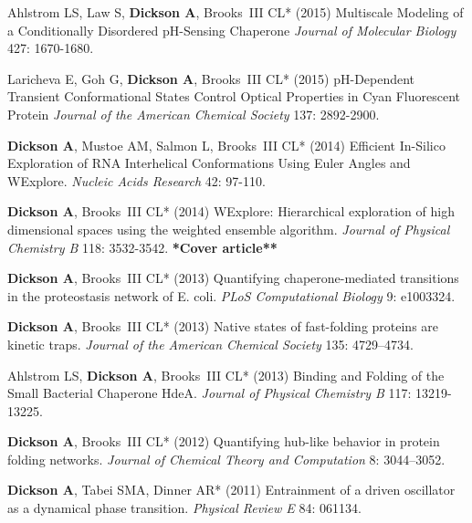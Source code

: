 \documentclass[margin,line]{res}
\begin{document}
\begin{resume}
\begin{spacing}{1.2}
\begin{thebibliography}{10}
Ahlstrom LS, Law S, {\bf Dickson A}, Brooks~{III} CL* (2015)
Multiscale Modeling of a Conditionally Disordered {pH}-Sensing Chaperone
\newblock \textit{Journal of Molecular Biology} 427: 1670-1680. 

Laricheva E, Goh G, {\bf Dickson A}, Brooks~{III} CL* (2015)
{pH}-Dependent Transient Conformational States Control Optical Properties in Cyan Fluorescent Protein
\newblock \textit{Journal of the American Chemical Society} 137: 2892-2900. 

{\bf Dickson A}, Mustoe AM, Salmon L, Brooks~{III} CL* (2014)
 Efficient In-Silico Exploration of {RNA} Interhelical Conformations Using Euler Angles and {WE}xplore.
\newblock \textit{Nucleic Acids Research} 42: 97-110.

{\bf Dickson A}, Brooks~{III} CL* (2014) {WE}xplore: Hierarchical
  exploration of high dimensional spaces using the weighted ensemble algorithm.
\newblock \textit{Journal of Physical Chemistry B} 118: 3532-3542. {\bf **Cover article**}

{\bf Dickson A}, Brooks~{III} CL* (2013) Quantifying chaperone-mediated
  transitions in the proteostasis network of {E}. coli.
\newblock \textit{PLoS Computational Biology} 9: e1003324.

{\bf Dickson A}, Brooks~{III} CL* (2013) {Native states of fast-folding proteins are
  kinetic traps.}
\newblock \textit{Journal of the American Chemical Society} 135: 4729--4734.

  Ahlstrom LS, {\bf Dickson A}, Brooks~{III} CL* (2013)
  Binding and Folding of the Small Bacterial Chaperone HdeA.
\newblock \textit{Journal of Physical Chemistry B} 117: 13219-13225.

{\bf Dickson A}, Brooks~{III} CL* (2012) Quantifying hub-like behavior in protein
  folding networks.
\newblock \textit{Journal of Chemical Theory and Computation} 8: 3044--3052.

{\bf Dickson A}, Tabei SMA, Dinner AR* (2011) {Entrainment of a driven oscillator as a
  dynamical phase transition}.
\newblock \textit{Physical Review E} 84: 061134.


\end{thebibliography}
\end{spacing}
\end{resume}
\end{document}
